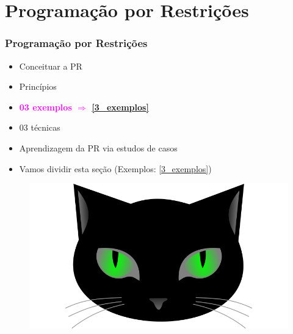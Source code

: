 
       
\section{Programação por Restrições}
\begin{frame}
\frametitle{Programação por Restrições}
\label{incio_PR}
\begin{minipage}{0.47\textwidth}
    \begin{itemize}
        \item Conceituar a PR
        \item Princípios
        \item \textcolor{magenta}{\textbf{03 exemplos $\Rightarrow$ \ref{3_exemplos}}}
        \item 03 técnicas 
        \item Aprendizagem da PR via estudos de casos
        \item Vamos dividir esta seção (Exemplos: \ref{3_exemplos})
    \end{itemize}
\end{minipage}
\begin{minipage}{0.5\textwidth}
\begin{figure}[ht!]
\begin{center}
\includegraphics[width=1.2\textwidth, height=0.40\textheight]{figures/logo_picat_alex.jpg}
\end{center}
\end{figure}
\end{minipage}
\end{frame}



